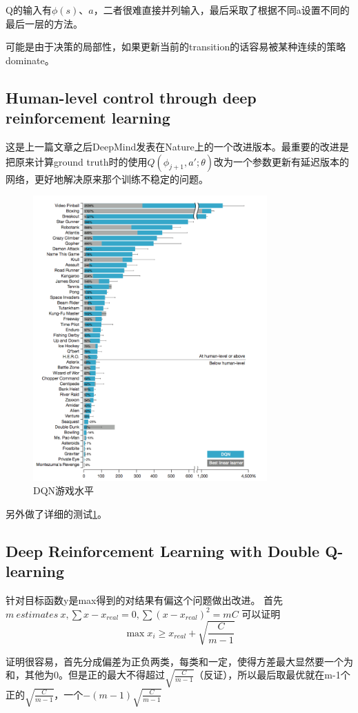 \documentclass[a4paper]{article}
\begin{document}
Q的输入有$\phi(s)、a$，二者很难直接并列输入，最后采取了根据不同a设置不同的最后一层的方法。

可能是由于决策的局部性，如果更新当前的transition的话容易被某种连续的策略dominate。
\subsection{Human-level control through deep reinforcement learning\cite{Mnih2015Human}}
这是上一篇文章之后DeepMind发表在Nature上的一个改进版本。最重要的改进是把原来计算ground truth时的使用$Q(\phi_{j+1},a';\theta)$改为一个参数更新有延迟版本的网络，更好地解决原来那个训练不稳定的问题。
\begin{figure}
\centering
\includegraphics[width=0.8\textwidth]{./img/27.png}
\caption{DQN游戏水平}
\label{fig:27}
\end{figure}
另外做了详细的测试\ref{fig:27}。
\subsection{Deep Reinforcement Learning with Double Q-learning\cite{DBLP:journals/corr/HasseltGS15}}
针对目标函数y是max得到的对结果有偏这个问题做出改进。
首先$m \ estimates \ x,\sum x - x_{real} = 0, \sum (x-x_{real})^2=mC$
可以证明$$\max x_i \geq x_{real} + \sqrt{\frac{C}{m-1}}$$

证明很容易，首先分成偏差为正负两类，每类和一定，使得方差最大显然要一个为和，其他为0。但是正的最大不得超过$\sqrt{\frac{C}{m-1}}$（反证），所以最后取最优就在m-1个正的$\sqrt{\frac{C}{m-1}}$$，一个$$-(m-1)\sqrt{\frac{C}{m-1}}$
\end{document}
